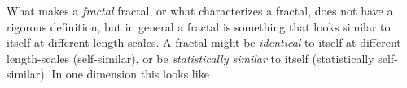 What makes a \emph{fractal} fractal, or what characterizes a fractal, does not have a rigorous definition, but in general a fractal is something that looks similar to itself at different length scales. A fractal might be \emph{identical} to itself at different length-scales (self-similar), or be \emph{statistically similar} to itself (statistically self-similar). In one dimension this looks like 



% 
% 

